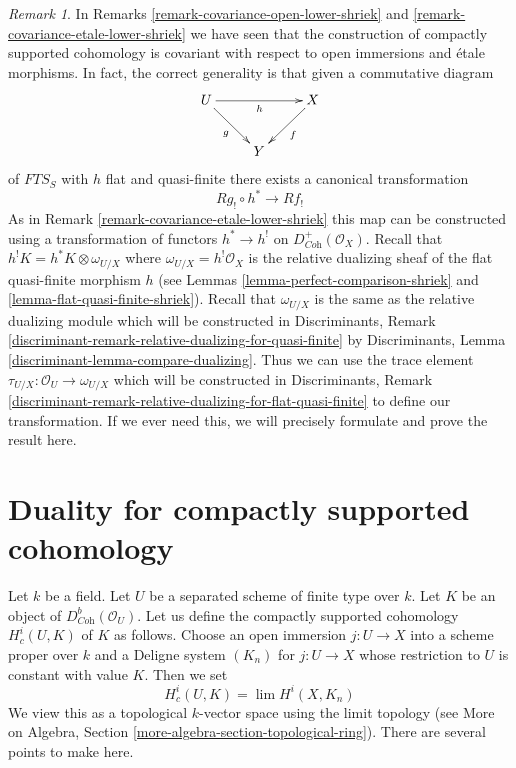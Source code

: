 \documentclass{stacks-project}
\theoremstyle{plain}
\theoremstyle{definition}
\theoremstyle{remark}
\newtheorem{remark}[subsection]{Remark}
\numberwithin{equation}{subsection}
\def\lim{\mathop{\mathrm{lim}}\nolimits}
\begin{document}
\begin{remark}
\label{remark-covariance-lower-shriek}
In Remarks \ref{remark-covariance-open-lower-shriek} and
\ref{remark-covariance-etale-lower-shriek} we have seen
that the construction of compactly supported cohomology is
covariant with respect to open immersions and \'etale morphisms.
In fact, the correct generality is that given a commutative diagram
$$
\xymatrix{
U \ar[rr]_h \ar[rd]_g & & X \ar[ld]^f \\
& Y
}
$$
of $\textit{FTS}_S$ with $h$ flat and quasi-finite there exists a
canonical transformation
$$
Rg_! \circ h^* \longrightarrow Rf_!
$$
As in Remark \ref{remark-covariance-etale-lower-shriek}
this map can be constructed using a transformation of functors
$h^* \to h^!$ on $D^+_{\textit{Coh}}(\mathcal{O}_X)$. Recall that
$h^!K = h^*K \otimes \omega_{U/X}$ where $\omega_{U/X} = h^!\mathcal{O}_X$
is the relative dualizing sheaf of the flat quasi-finite morphism $h$ (see
Lemmas \ref{lemma-perfect-comparison-shriek} and
\ref{lemma-flat-quasi-finite-shriek}).
Recall that $\omega_{U/X}$ is the same as the relative dualizing
module which will be constructed in Discriminants, Remark
\ref{discriminant-remark-relative-dualizing-for-quasi-finite}
by
Discriminants, Lemma \ref{discriminant-lemma-compare-dualizing}.
Thus we can use the trace element
$\tau_{U/X} : \mathcal{O}_U \to \omega_{U/X}$
which will be constructed in Discriminants, Remark
\ref{discriminant-remark-relative-dualizing-for-flat-quasi-finite}
to define our transformation.
If we ever need this, we will precisely formulate
and prove the result here.
\end{remark}







\section{Duality for compactly supported cohomology}
\label{section-duality-compactly-supported}

\noindent
Let $k$ be a field. Let $U$ be a separated scheme of finite type over $k$.
Let $K$ be an object of $D^b_{\textit{Coh}}(\mathcal{O}_U)$. Let us define
the compactly supported cohomology $H^i_c(U, K)$ of $K$ as follows.
Choose an open immersion $j : U \to X$ into a scheme proper over $k$
and a Deligne system $(K_n)$ for $j : U \to X$ whose restriction
to $U$ is constant with value $K$. Then we set
$$
H^i_c(U, K) = \lim H^i(X, K_n)
$$
We view this as a topological $k$-vector space using the limit topology
(see More on Algebra, Section \ref{more-algebra-section-topological-ring}).
There are several points to make here.
\end{document}
